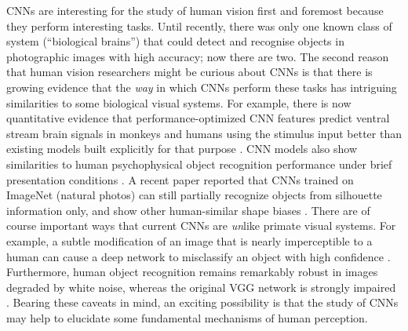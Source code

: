 \documentclass[article, 11pt,a4paper,natbib]{apa6}\usepackage[]{graphicx}\usepackage[]{color}
\begin{document}
CNNs are interesting for the study of human vision first and foremost because they perform interesting tasks. 
Until recently, there was only one known class of system (``biological brains'') that could detect and recognise objects in photographic images with high accuracy; now there are two.
The second reason that human vision researchers might be curious about CNNs is that there is growing evidence that the \textit{way} in which CNNs perform these tasks has  intriguing similarities to some biological visual systems.
For example, there is now quantitative evidence that performance-optimized CNN features predict ventral stream brain signals in monkeys and humans using the stimulus input better than existing models built explicitly for that purpose
\citep{cadieu_deep_2014, yamins_performanceoptimized_2014, yamins_hierarchical_2013, khaligh-razavi_deep_2014, cichy_dynamics_2016, cichy_comparison_2016, guclu_deep_2015, hong_explicit_2016}.
CNN models also show similarities to human psychophysical object recognition performance under brief presentation conditions \citep{hong_explicit_2016, yamins_performanceoptimized_2014}. 
A recent paper reported that CNNs trained on ImageNet (natural photos) can still partially recognize objects from silhouette information only, and show other human-similar shape biases \citep{kubilius_deep_2016}.
There are of course important ways that current CNNs are \textit{un}like primate visual systems. 
For example, a subtle modification of an image that is nearly imperceptible to a human can cause a deep network to misclassify an object with high confidence \citep[][see \citet{yamins_using_2016} for additional discussion]{szegedy_intriguing_2013}.
Furthermore, human object recognition remains remarkably robust in images degraded by white noise, whereas the original VGG network is strongly impaired \citep{geirhos_comparing_2017}.
Bearing these caveats in mind, an exciting possibility is that the study of CNNs may help to elucidate some fundamental mechanisms of human perception.
\end{document}
